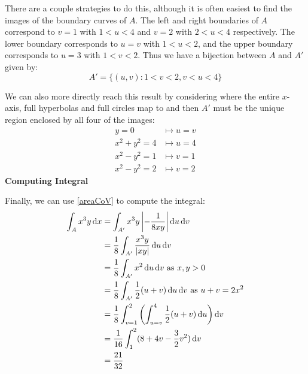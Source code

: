 \documentclass[../main.tex]{subfiles}
\begin{document}
\begin{example}
  There are a couple strategies to do this, although it is often easiest to find the images of the boundary curves of $A$.
  The left and right boundaries of $A$ correspond to $v = 1$ with $1 < u < 4$ and $v = 2$ with $2 < u  < 4$ respectively.
  The lower boundary corresponds to $u = v$ with $1 < u < 2$, and the upper boundary corresponds to $u = 3$ with $1 < v < 2$.
  Thus we have a bijection between $A$ and $A'$ given by:
  \[
    A' = \{(u, v): 1 < v < 2, v < u < 4\}
  \]
  \begin{center}
  \end{center}
  We can also more directly reach this result by considering where the entire $x$-axis, full hyperbolas and full circles map to and then $A'$ must be the unique region enclosed by all four of the images:
  \begin{align*}
    y = 0 &\mapsto u = v \\
    x^2 + y^2 = 4 &\mapsto u = 4 \\
    x^2 - y^2 = 1 &\mapsto v = 1 \\
    x^2 - y^2 = 2 &\mapsto v = 2
  \end{align*}
  \textbf{Computing Integral}\par
  Finally, we can use \cref{areaCoV} to compute the integral:
  \begin{align*}
    \int_{A} x^3y \d{x} &= \int_{A'} x^3y \abs{-\frac{1}{8xy}} \d{u}\d{v} \\
                        &= \frac{1}{8} \int_{A'} \frac{x^3y}{|xy|} \d{u}\d{v} \\
                        &= \frac{1}{8} \int_{A'} x^2 \d{u}\d{v} \text{ as $x , y > 0$} \\
                        &= \frac{1}{8} \int_{A'} \frac{1}{2}(u + v) \d{u}\d{v} \text{ as $u + v = 2x^2$} \\
                        &= \frac{1}{8} \int_{v = 1}^{2} \left(\int_{u = v}^{4} \frac{1}{2}(u + v) \d{u}\right) \d{v} \\
                        &= \frac{1}{16} \int_{1}^{2} (8 + 4v - \frac{3}{2}v^2)\d{v} \\
                        &= \frac{21}{32}
  \end{align*}
\end{example}
\end{document}
